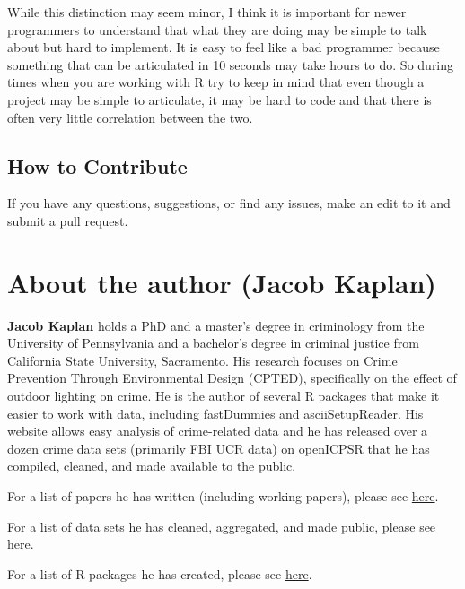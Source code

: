 \documentclass[
  12pt,
]{book}
\begin{document}
While this distinction may seem minor, I think it is important for newer programmers to understand that what they are doing may be simple to talk about but hard to implement. It is easy to feel like a bad programmer because something that can be articulated in 10 seconds may take hours to do. So during times when you are working with R try to keep in mind that even though a project may be simple to articulate, it may be hard to code and that there is often very little correlation between the two.

\hypertarget{how-to-contribute}{%
\section*{How to Contribute}\label{how-to-contribute}}


If you have any questions, suggestions, or find any issues, make an edit to it and submit a pull request.

\hypertarget{about-the-author-jacob-kaplan}{%
\chapter*{About the author (Jacob Kaplan)}\label{about-the-author-jacob-kaplan}}


\textbf{Jacob Kaplan} holds a PhD and a master's degree in criminology from the University of Pennsylvania and a bachelor's degree in criminal justice from California State University, Sacramento. His research focuses on Crime Prevention Through Environmental Design (CPTED), specifically on the effect of outdoor lighting on crime. He is the author of several R packages that make it easier to work with data, including \href{https://jacobkap.github.io/fastDummies/}{fastDummies} and \href{https://jacobkap.github.io/asciiSetupReader/}{asciiSetupReader}. His \href{http://jacobdkaplan.com/}{website} allows easy analysis of crime-related data and he has released over a \href{http://jacobdkaplan.com/data.html}{dozen crime data sets} (primarily FBI UCR data) on openICPSR that he has compiled, cleaned, and made available to the public.

For a list of papers he has written (including working papers), please see \href{http://jacobdkaplan.com/research.html}{here}.

For a list of data sets he has cleaned, aggregated, and made public, please see \href{http://jacobdkaplan.com/data.html}{here}.

For a list of R packages he has created, please see \href{https://jacobdkaplan.com/packages.html}{here}.
\end{document}
